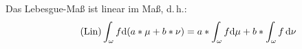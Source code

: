 \begin{*erinnerung}
	Das Lebesgue-Maß ist linear im Maß, d.\,h.:
	\begin{align}\label{eqLinMasse}\tag{Lin}
		\int_\omega f \mathrm{d}{(a*\mu + b*\nu)} = a*\int_\omega f \mathrm{d}{\mu} + b*\int_\omega f \, \mathrm{d}{\nu}
	\end{align}
\end{*erinnerung}
%
%
%
%
